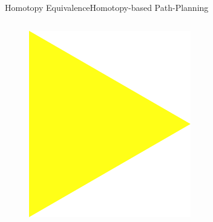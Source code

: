 \begin{frame}{Homotopy Equivalence}{Homotopy-based Path-Planning}
\begin{columns}
\begin{figure}
	\includegraphics[width=\linewidth]{figure/arrow2}
\end{figure}
\begin{figure}
	\centering

\end{figure}
\end{columns}
\end{frame}
